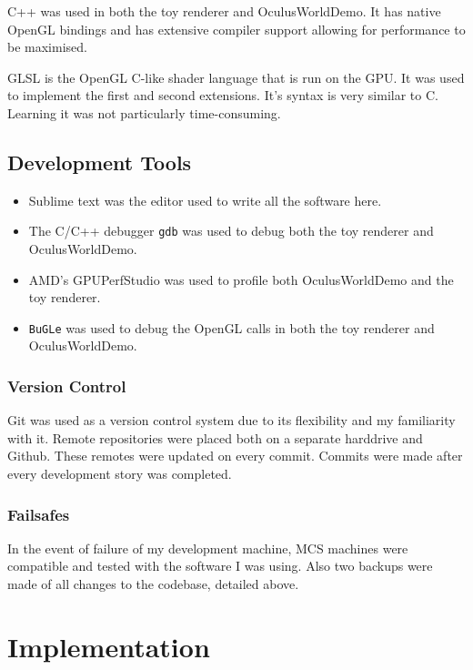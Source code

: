 \documentclass[12pt,a4paper,twoside,openright]{report}
\begin{document}
C++ was used in both the toy renderer and OculusWorldDemo. It has native OpenGL bindings and has extensive compiler support allowing for performance to be maximised.

GLSL is the OpenGL C-like shader language that is run on the GPU. It was used to implement the first and second extensions. It's syntax is very similar to C. Learning it was not particularly time-consuming.

\section{Development Tools}

\begin{itemize}
\item Sublime text was the editor used to write all the software here.

\item The C/C++ debugger \texttt{gdb} was used to debug both the toy renderer and OculusWorldDemo.

\item AMD's GPUPerfStudio was used to profile both OculusWorldDemo and the toy renderer.

\item \texttt{BuGLe} was used to debug the OpenGL calls in both the toy renderer and OculusWorldDemo.

\end{itemize}
\subsection{Version Control}

Git was used as a version control system due to its flexibility and my familiarity with it. Remote repositories were placed both on a separate harddrive and Github. These remotes were updated on every commit. Commits were made after every development story was completed.

\subsection{Failsafes}

In the event of failure of my development machine, MCS machines were compatible and tested with the software I was using. Also two backups were made of all changes to the codebase, detailed above.

\chapter{Implementation}
\end{document}
